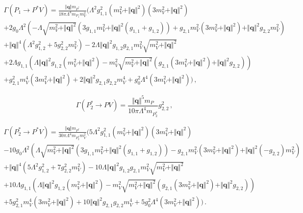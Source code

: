 \documentclass{article}
\begin{document}
\begin{multline}
  \Gamma\left( P_1 \to P^* V \right) = \frac{\Vert \mathbf{q} \Vert m_{P^*}}{18 \pi  \Lambda ^4 m_{P_1} m_V^2}
  \Bigg(\Lambda ^2 g_{1,1}^2 \left(m_V^2+\Vert \mathbf{q} \Vert^2\right) \left(3 m_V^2+\Vert \mathbf{q} \Vert^2\right) \\
  +2 g_0 \Lambda ^2 \left(-\Lambda  \sqrt{m_V^2+\Vert \mathbf{q} \Vert^2} \left(3 g_{1,1} m_V^2+\Vert \mathbf{q} \Vert^2 \left(g_{1,1}+g_{1,2}\right)\right)+g_{2,1} m_V^2 \left(3 m_V^2+\Vert \mathbf{q} \Vert^2\right)+\Vert \mathbf{q} \Vert^2 g_{2,2} m_V^2\right) \\
  +\Vert \mathbf{q} \Vert^4 \left(\Lambda ^2 g_{1,2}^2+5 g_{2,2}^2 m_V^2\right)-2 \Lambda  \Vert \mathbf{q} \Vert^2 g_{1,2} g_{2,1} m_V^2 \sqrt{m_V^2+\Vert \mathbf{q} \Vert^2} \\
  +2 \Lambda  g_{1,1} \left(\Lambda  \Vert \mathbf{q} \Vert^2 g_{1,2} \left(m_V^2+\Vert \mathbf{q} \Vert^2\right)-m_V^2 \sqrt{m_V^2+\Vert \mathbf{q} \Vert^2} \left(g_{2,1} \left(3 m_V^2+\Vert \mathbf{q} \Vert^2\right)+\Vert \mathbf{q} \Vert^2 g_{2,2}\right)\right) \\
  +g_{2,1}^2 m_V^4 \left(3 m_V^2+\Vert \mathbf{q} \Vert^2\right)+2 \Vert \mathbf{q} \Vert^2 g_{2,1} g_{2,2} m_V^4+g_0^2 \Lambda ^4 \left(3 m_V^2+\Vert \mathbf{q} \Vert^2\right)\Bigg) \, ,
\end{multline}

\begin{equation}
  \Gamma\left( P^*_2 \to P V \right) = \frac{\Vert \mathbf{q} \Vert^5 m_P}{10 \pi  \Lambda ^4 m_{P_2^*}} g_{2,2}^2 \, ,
\end{equation}

\begin{multline}
  \Gamma\left( P^*_2 \to P^* V \right) = \frac{\Vert \mathbf{q} \Vert m_{P^*}}{30 \pi  \Lambda ^4 m_{P_2^*} m_V^2}
  \Bigg(5 \Lambda ^2 g_{1,1}^2 \left(m_V^2+\Vert \mathbf{q} \Vert^2\right) \left(3 m_V^2+\Vert \mathbf{q} \Vert^2\right) \\
    -10 g_0 \Lambda ^2 \left(\Lambda  \sqrt{m_V^2+\Vert \mathbf{q} \Vert^2} \left(3 g_{1,1} m_V^2+\Vert \mathbf{q} \Vert^2 \left(g_{1,1}+g_{1,2}\right)\right)-g_{2,1} m_V^2 \left(3 m_V^2+\Vert \mathbf{q} \Vert^2\right)+\Vert \mathbf{q} \Vert^2 \left(-g_{2,2}\right) m_V^2\right) \\
  +\Vert \mathbf{q} \Vert^4 \left(5 \Lambda ^2 g_{1,2}^2+7 g_{2,2}^2 m_V^2\right)-10 \Lambda  \Vert \mathbf{q} \Vert^2 g_{1,2} g_{2,1} m_V^2 \sqrt{m_V^2+\Vert \mathbf{q} \Vert^2} \\
  +10 \Lambda  g_{1,1} \left(\Lambda  \Vert \mathbf{q} \Vert^2 g_{1,2} \left(m_V^2+\Vert \mathbf{q} \Vert^2\right)-m_V^2 \sqrt{m_V^2+\Vert \mathbf{q} \Vert^2} \left(g_{2,1} \left(3 m_V^2+\Vert \mathbf{q} \Vert^2\right)+\Vert \mathbf{q} \Vert^2 g_{2,2}\right)\right) \\
+5 g_{2,1}^2 m_V^4 \left(3 m_V^2+\Vert \mathbf{q} \Vert^2\right)+10 \Vert \mathbf{q} \Vert^2 g_{2,1} g_{2,2} m_V^4+5 g_0^2 \Lambda ^4 \left(3 m_V^2+\Vert \mathbf{q} \Vert^2\right)\Bigg) \, .
\end{multline}
\end{document}
